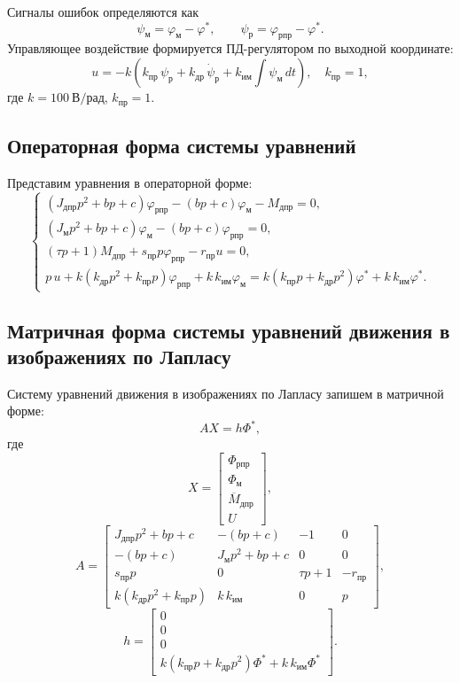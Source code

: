 \documentclass[a4paper, 14pt]{extarticle}
\begin{document}
Сигналы ошибок определяются как
\[
	\psi_\text{м}=\varphi_\text{м}-\varphi^*,\qquad
	\psi_\text{р}=\varphi_{\text{рпр}}-\varphi^*.
\]
Управляющее воздействие формируется ПД-регулятором по выходной координате:
\[
	u=-k\!\left(k_\text{пр}\,\psi_\text{р}+k_\text{др}\,\dot{\psi}_\text{р}+k_\text{им}\!\int\!\psi_\text{м}\,dt\right),\quad k_\text{пр}=1,
\]
где $k=100~\text{В/рад}$, $k_\text{пр}=1$.

\subsection{Операторная форма системы уравнений}

Представим уравнения в операторной форме:
\[
	\begin{cases}
		(J_{\text{дпр}}p^2+bp+c)\varphi_{\text{рпр}}-(bp+c)\varphi_\text{м}-M_{\text{дпр}}=0, \\
		(J_\text{м}p^2+bp+c)\varphi_\text{м}-(bp+c)\varphi_{\text{рпр}}=0,                    \\
		(\tau p+1)M_{\text{дпр}}+s_{\text{пр}}p\varphi_{\text{рпр}}-r_{\text{пр}}u=0,         \\
		p\,u+k(k_\text{др}p^2+k_\text{пр}p)\varphi_{\text{рпр}}+k\,k_\text{им}\varphi_\text{м}
		=k(k_\text{пр}p+k_\text{др}p^2)\varphi^*+k\,k_\text{им}\varphi^*.
	\end{cases}
\]

\subsection{Матричная форма системы уравнений движения в изображениях по Лапласу}

Систему уравнений движения в изображениях по Лапласу запишем в матричной форме:
\[
	AX=h\Phi^*,
\]
где
\[
	X=
	\begin{bmatrix}
		\Phi_{\text{рпр}}         \\
		\Phi_\text{м}             \\
		\overline{M}_{\text{дпр}} \\
		U
	\end{bmatrix},
\]
\[
	A=
	\begin{bmatrix}
		J_{\text{дпр}}p^2+bp+c         & -(bp+c)            & -1       & 0              \\
		-(bp+c)                        & J_\text{м}p^2+bp+c & 0        & 0              \\
		s_{\text{пр}}p                 & 0                  & \tau p+1 & -r_{\text{пр}} \\
		k(k_\text{др}p^2+k_\text{пр}p) & k\,k_\text{им}     & 0        & p
	\end{bmatrix},
\]
\[
	h=
	\begin{bmatrix}
		0 \\
		0 \\
		0 \\
		k(k_\text{пр}p+k_\text{др}p^2)\Phi^*+k\,k_\text{им}\Phi^*
	\end{bmatrix}.
\]
\end{document}
